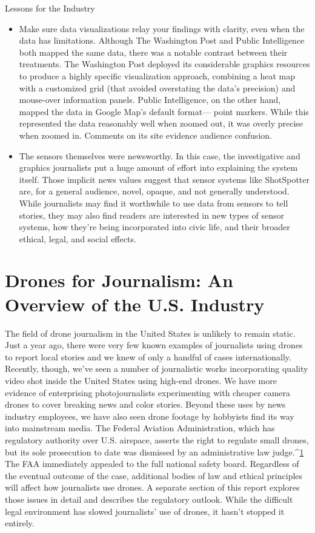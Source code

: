 Lessons for the Industry
\begin{itemize}
\item Make sure data visualizations relay your findings with clarity,
even when the data has limitations.
Although The Washington Post and Public Intelligence both mapped
the same data, there was a notable contrast between their treatments.
The Washington Post deployed its considerable graphics resources to
produce a highly specific visualization approach, combining a heat
map with a customized grid (that avoided overstating the data's precision)
and mouse-over information panels. Public Intelligence, on
the other hand, mapped the data in Google Map's default format—
point markers. While this represented the data reasonably well when
zoomed out, it was overly precise when zoomed in. Comments on its
site evidence audience confusion.
\item The sensors themselves were newsworthy.
In this case, the investigative and graphics journalists put a huge
amount of effort into explaining the system itself. Those implicit news
values suggest that sensor systems like ShotSpotter are, for a general
audience, novel, opaque, and not generally understood. While journalists
may find it worthwhile to use data from sensors to tell stories,
they may also find readers are interested in new types of sensor systems,
how they're being incorporated into civic life, and their broader
ethical, legal, and social effects.
\end{itemize}

\section{Drones for Journalism: An Overview of the U.S. Industry}
The field of drone journalism in the United States is unlikely to remain
static. Just a year ago, there were very few known examples of journalists
using drones to report local stories and we knew of only a handful of cases
internationally. Recently, though, we've seen a number of journalistic works
incorporating quality video shot inside the United States using high-end
drones. We have more evidence of enterprising photojournalists experimenting
with cheaper camera drones to cover breaking news and color
stories. Beyond these uses by news industry employees, we have also seen
drone footage by hobbyists find its way into mainstream media.
The Federal Aviation Administration, which has regulatory authority over
U.S. airspace, asserts the right to regulate small drones, but its sole prosecution
to date was dismissed by an administrative law judge.^{\href{#endnotes-industry-overview}{1}} The FAA immediately
appealed to the full national safety board. Regardless of the eventual
outcome of the case, additional bodies of law and ethical principles will
affect how journalists use drones. A separate section of this report explores
those issues in detail and describes the regulatory outlook. While the difficult
legal environment has slowed journalists' use of drones, it hasn't
stopped it entirely.

